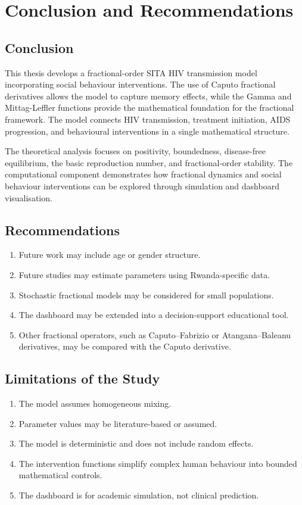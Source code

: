 \documentclass[12pt,a4paper,oneside]{report}
\begin{document}
\chapter{Conclusion and Recommendations}

\section{Conclusion}
This thesis develops a fractional-order SITA HIV transmission model incorporating social behaviour interventions. The use of Caputo fractional derivatives allows the model to capture memory effects, while the Gamma and Mittag-Leffler functions provide the mathematical foundation for the fractional framework. The model connects HIV transmission, treatment initiation, AIDS progression, and behavioural interventions in a single mathematical structure.

The theoretical analysis focuses on positivity, boundedness, disease-free equilibrium, the basic reproduction number, and fractional-order stability. The computational component demonstrates how fractional dynamics and social behaviour interventions can be explored through simulation and dashboard visualisation.

\section{Recommendations}
\begin{enumerate}
  \item Future work may include age or gender structure.
  \item Future studies may estimate parameters using Rwanda-specific data.
  \item Stochastic fractional models may be considered for small populations.
  \item The dashboard may be extended into a decision-support educational tool.
  \item Other fractional operators, such as Caputo--Fabrizio or Atangana--Baleanu derivatives, may be compared with the Caputo derivative.
\end{enumerate}

\section{Limitations of the Study}
\begin{enumerate}
  \item The model assumes homogeneous mixing.
  \item Parameter values may be literature-based or assumed.
  \item The model is deterministic and does not include random effects.
  \item The intervention functions simplify complex human behaviour into bounded mathematical controls.
  \item The dashboard is for academic simulation, not clinical prediction.
\end{enumerate}
\end{document}
